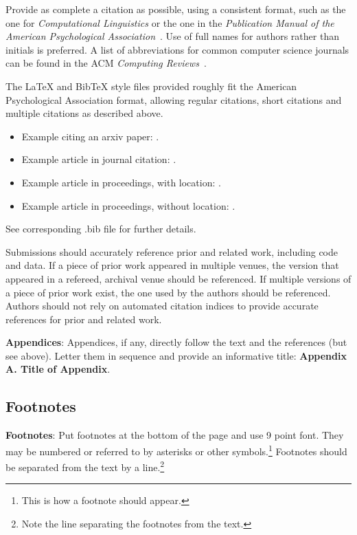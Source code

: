 Provide as complete a citation as possible, using a consistent format,
such as the one for {\em Computational Linguistics\/} or the one in the 
{\em Publication Manual of the American 
Psychological Association\/}~\cite{APA:83}. Use of full names for
authors rather than initials is preferred. A list of abbreviations
for common computer science journals can be found in the ACM 
{\em Computing Reviews\/}~\cite{ACM:83}.

The \LaTeX{} and Bib\TeX{} style files provided roughly fit the
American Psychological Association format, allowing regular citations, 
short citations and multiple citations as described above.  

\begin{itemize}
\item Example citing an arxiv paper: \cite{rasooli-tetrault-2015}. 
\item Example article in journal citation: \cite{Ando2005}.
\item Example article in proceedings, with location: \cite{borsch2011}.
\item Example article in proceedings, without location: \cite{andrew2007scalable}.
\end{itemize}
See corresponding .bib file for further details.

Submissions should accurately reference prior and related work, including code and data. If a piece of prior work appeared in multiple venues, the version that appeared in a refereed, archival venue should be referenced. If multiple versions of a piece of prior work exist, the one used by the authors should be referenced. Authors should not rely on automated citation indices to provide accurate references for prior and related work.

{\bf Appendices}: Appendices, if any, directly follow the text and the
references (but see above).  Letter them in sequence and provide an
informative title: {\bf Appendix A. Title of Appendix}.

\subsection{Footnotes}

{\bf Footnotes}: Put footnotes at the bottom of the page and use 9
point font. They may be numbered or referred to by asterisks or other
symbols.\footnote{This is how a footnote should appear.} Footnotes
should be separated from the text by a line.\footnote{Note the line
separating the footnotes from the text.}

